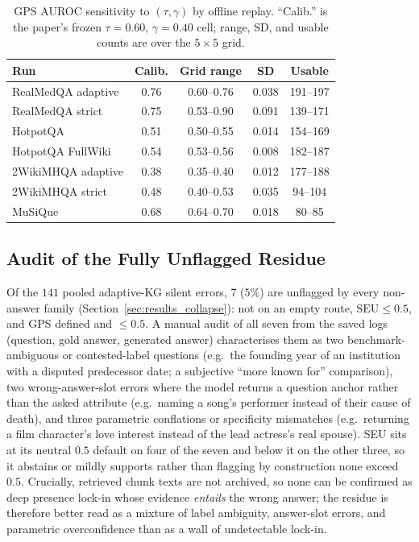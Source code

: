 \begin{table}[t]
\centering
\small
\caption{GPS AUROC sensitivity to $(\tau, \gamma)$ by offline replay.
``Calib.'' is the paper's frozen $\tau{=}0.60$, $\gamma{=}0.40$ cell; range,
SD, and usable counts are over the $5\times5$ grid.
\label{tab:gps_sensitivity}}
\setlength{\tabcolsep}{4pt}
\begin{tabular}{@{}lcccc@{}}
\toprule
Run & Calib. & Grid range & SD & Usable \\
\midrule
RealMedQA adaptive & 0.76 & 0.60--0.76 & 0.038 & 191--197 \\
RealMedQA strict   & 0.75 & 0.53--0.90 & 0.091 & 139--171 \\
HotpotQA           & 0.51 & 0.50--0.55 & 0.014 & 154--169 \\
HotpotQA FullWiki  & 0.54 & 0.53--0.56 & 0.008 & 182--187 \\
2WikiMHQA adaptive & 0.38 & 0.35--0.40 & 0.012 & 177--188 \\
2WikiMHQA strict   & 0.48 & 0.40--0.53 & 0.035 & 94--104 \\
MuSiQue            & 0.68 & 0.64--0.70 & 0.018 & 80--85 \\
\bottomrule
\end{tabular}
\end{table}

\subsection{Audit of the Fully Unflagged Residue}
\label{sec:appendix_residue}

Of the $141$ pooled adaptive-KG silent errors, $7$ ($5\%$) are unflagged by
every non-answer family (Section~\ref{sec:results_collapse}): not on an empty route,
$\mathrm{SEU}\leq 0.5$, and GPS defined and $\leq 0.5$.
A manual audit of all seven from the saved logs (question, gold answer,
generated answer) characterises them as two benchmark-ambiguous or
contested-label questions (e.g.\ the founding year of an institution with a
disputed predecessor date; a subjective ``more known for'' comparison), two
wrong-answer-slot errors where the model returns a question anchor rather than
the asked attribute (e.g.\ naming a song's performer instead of their cause of
death), and three parametric conflations or specificity mismatches (e.g.\
returning a film character's love interest instead of the lead actress's real
spouse).
SEU sits at its neutral $0.5$ default on four of the seven and below it on the
other three, so it abstains or mildly supports rather than flagging by
construction none exceed $0.5$.
Crucially, retrieved chunk texts are not archived, so none can be confirmed as
deep presence lock-in whose evidence \emph{entails} the wrong answer; the
residue is therefore better read as a mixture of label ambiguity, answer-slot
errors, and parametric overconfidence than as a wall of undetectable lock-in.

